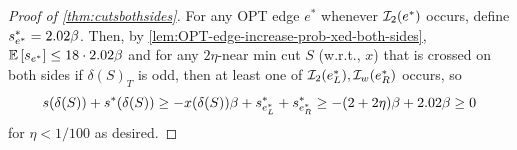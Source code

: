 \begin{proof}[Proof of \cref{thm:cutsbothsides}]
For any OPT edge $e^*$  whenever ${\cal I}_2(e^*)$ occurs, define $s^*_{e^*}=2.02\beta $. Then, 
by \cref{lem:OPT-edge-increase-prob-xed-both-sides}, 
${\mathbb{E}}\left[s_{e^*}\right] \leq 18 \cdot 2.02\beta$ and for any $2\eta$-near min cut $S$ (w.r.t., $x$) that is crossed on both sides if $\delta(S)_T$ is odd, then at least one of ${\cal I}_2(e^*_L),{\cal I}_w(e^*_R)$ occurs, so
$$ s(\delta(S)) + s^*(\delta(S)) \geq  - x(\delta(S))\beta + s^*_{e^*_L}+s^*_{e^*_R} \geq -(2+2\eta)\beta + 2.02\beta \geq 0$$
for $\eta<1/100$ as desired.
\end{proof}



